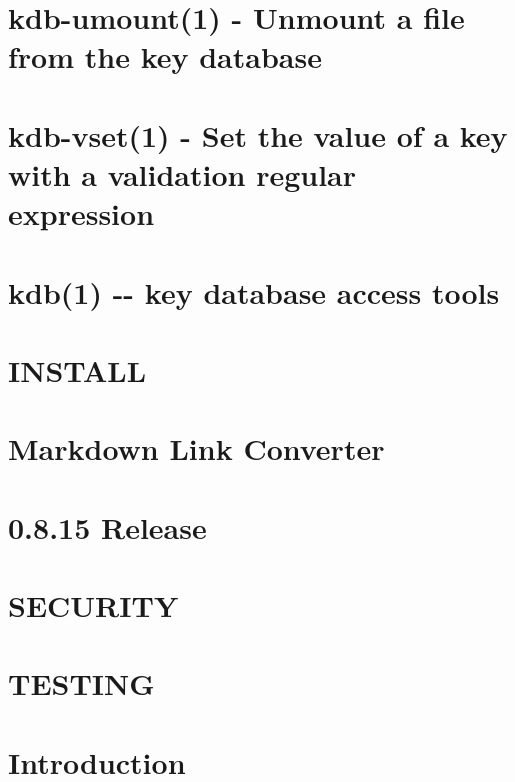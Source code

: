 \documentclass[twoside]{book}
\newcommand{\+}{\discretionary{\mbox{\scriptsize$\hookleftarrow$}}{}{}}
\begin{document}
\chapter{kdb-\/umount(1) -\/ Unmount a file from the key database}
\label{md_doc_help_kdb-umount}
\hypertarget{md_doc_help_kdb-umount}{}

\chapter{kdb-\/vset(1) -\/ Set the value of a key with a validation regular expression}
\label{md_doc_help_kdb-vset}
\hypertarget{md_doc_help_kdb-vset}{}

\chapter{kdb(1) -\/-\/ key database access tools}
\label{md_doc_help_kdb}
\hypertarget{md_doc_help_kdb}{}

\chapter{I\+N\+S\+T\+A\+L\+L}
\label{doc_INSTALL_md}
\hypertarget{doc_INSTALL_md}{}

\chapter{Markdown Link Converter}
\label{doc_markdownlinkconverter_README_md}
\hypertarget{doc_markdownlinkconverter_README_md}{}

\chapter{0.8.15 Release}
\label{doc_NEWS_md}
\hypertarget{doc_NEWS_md}{}

\chapter{S\+E\+C\+U\+R\+I\+T\+Y}
\label{doc_SECURITY_md}
\hypertarget{doc_SECURITY_md}{}

\chapter{T\+E\+S\+T\+I\+N\+G}
\label{doc_TESTING_md}
\hypertarget{doc_TESTING_md}{}

\chapter{Introduction}
\label{doc_tutorials_application-integration_md}
\hypertarget{doc_tutorials_application-integration_md}{}

\end{document}

